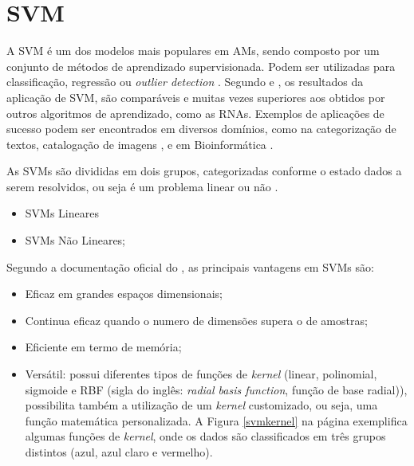 \section{SVM}

A SVM é um dos modelos mais populares em AMs, sendo composto por um conjunto de métodos de aprendizado supervisionada. Podem ser utilizadas para classificação, regressão ou \textit{outlier detection} \cite{scikitlearn}. Segundo  e , os resultados da aplicação de SVM, são comparáveis e muitas vezes superiores aos obtidos por outros algoritmos de aprendizado, como as RNAs. Exemplos de aplicações de sucesso podem ser encontrados em diversos domínios, como na categorização de textos,  catalogação de imagens \cite{pontil1998support}, e em Bioinformática \cite{noble2004support}.

As SVMs são divididas em dois grupos, categorizadas conforme o estado dados a serem resolvidos, ou seja é um problema linear ou não \cite{lorena2007introduccao}.
\begin{itemize}
    \item SVMs Lineares
    \item SVMs Não Lineares;
\end{itemize}

Segundo a documentação oficial do , as principais vantagens em SVMs são:

\begin{itemize}
    \item Eficaz em grandes espaços dimensionais;
    \item Continua eficaz quando o numero de dimensões supera o de amostras;
    \item Eficiente em termo de memória;
    \item Versátil: possui diferentes tipos de funções de \textit{kernel} (linear, polinomial, sigmoide e RBF (sigla do inglês: \textit{radial basis function}, função de base radial)), possibilita também a utilização de um \textit{kernel} customizado, ou seja, uma função matemática personalizada. A Figura \ref{svmkernel} na página \pageref{svmkernel} exemplifica algumas funções de \textit{kernel}, onde os dados são classificados em três grupos distintos (azul, azul claro e vermelho).
\end{itemize}

